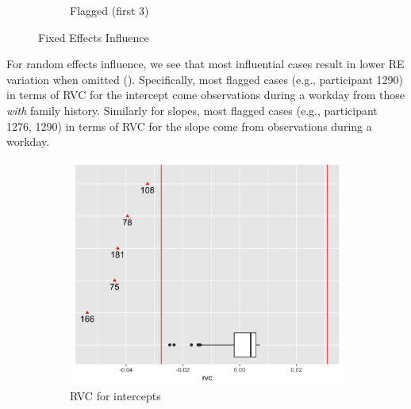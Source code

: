 \documentclass[12pt,twoside,letterpaper]{article}
\theoremstyle{definition}
\theoremstyle{definition}
\begin{document}
\begin{figure}[H]
\begin{subfigure}[b]{0.38\textwidth}
    \caption[]%
    {{\small Flagged (first 3) }}
    \label{fig: cook flagged}
    \end{subfigure}
    \caption[]
    {\small Fixed Effects Influence}
    \label{fig: cook and flagged}
    \end{figure}

For random effects influence, we see that most influential cases result in lower RE variation when omitted (). Specifically, most flagged cases (e.g., participant 1290) in terms of RVC for the intercept come observations during a workday from those \emph{with} family history. Similarly for slopes, most flagged cases (e.g., participant 1276, 1290) in terms of RVC for the slope come from observations during a workday.
\begin{figure}[H] 
    \centering
    \begin{subfigure}[b]{0.36\textwidth}
    \centering
    \includegraphics[width=\textwidth]{pics/rvc int.png}
    \caption[]%
    {{\small RVC for intercepts}}
    \label{fig: rvc int}
    \end{subfigure}
    \begin{subfigure}[b]{0.36\textwidth}
    \centering

\end{subfigure}
\end{figure}
\end{document}
